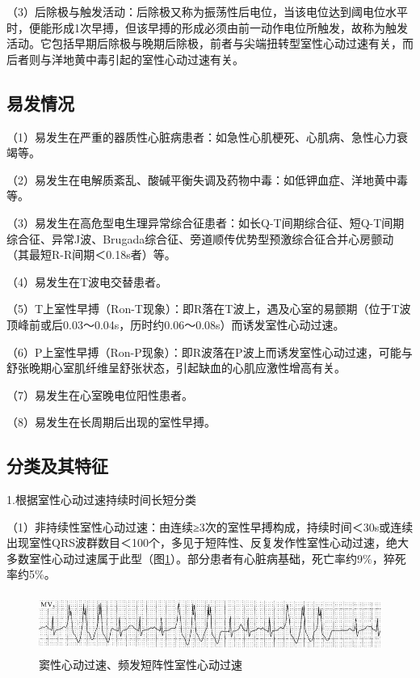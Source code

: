 （3）后除极与触发活动：后除极又称为振荡性后电位，当该电位达到阈电位水平时，便能形成1次早搏，但该早搏的形成必须由前一动作电位所触发，故称为触发活动。它包括早期后除极与晚期后除极，前者与尖端扭转型室性心动过速有关，而后者则与洋地黄中毒引起的室性心动过速有关。

\protect\hypertarget{text00040.htmlux5cux23subid444}{}{}

\subsection{易发情况}

（1）易发生在严重的器质性心脏病患者：如急性心肌梗死、心肌病、急性心力衰竭等。

（2）易发生在电解质紊乱、酸碱平衡失调及药物中毒：如低钾血症、洋地黄中毒等。

（3）易发生在高危型电生理异常综合征患者：如长Q-T间期综合征、短Q-T间期综合征、异常J波、Brugada综合征、旁道顺传优势型预激综合征合并心房颤动（其最短R-R间期＜0.18s者）等。

（4）易发生在T波电交替患者。

（5）T上室性早搏（Ron-T现象）：即R落在T波上，遇及心室的易颤期（位于T波顶峰前或后0.03～0.04s，历时约0.06～0.08s）而诱发室性心动过速。

（6）P上室性早搏（Ron-P现象）：即R波落在P波上而诱发室性心动过速，可能与舒张晚期心室肌纤维呈舒张状态，引起缺血的心肌应激性增高有关。

（7）易发生在心室晚电位阳性患者。

（8）易发生在长周期后出现的室性早搏。

\protect\hypertarget{text00040.htmlux5cux23subid445}{}{}

\subsection{分类及其特征}

1.根据室性心动过速持续时间长短分类

（1）非持续性室性心动过速：由连续≥3次的室性早搏构成，持续时间＜30s或连续出现室性QRS波群数目＜100个，多见于短阵性、反复发作性室性心动过速，绝大多数室性心动过速属于此型（图\ref{fig33-1}）。部分患者有心脏病基础，死亡率约9\%，猝死率约5\%。

\begin{figure}[!htbp]
 \centering
 \includegraphics[width=5.58333in,height=0.76042in]{./images/Image00530.jpg}
 \captionsetup{justification=centering}
 \caption{窦性心动过速、频发短阵性室性心动过速}
 \label{fig33-1}
  \end{figure} 

